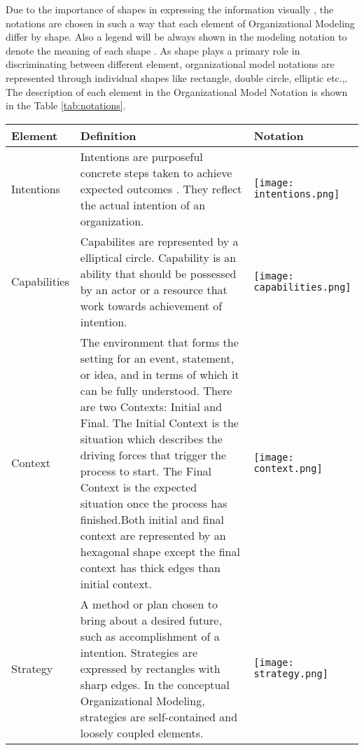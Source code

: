  Due to the importance of shapes in expressing the information visually , the notations are chosen in such a way that each element of Organizational Modeling  differ by shape. Also a legend will be always shown in the modeling notation to denote the meaning of each shape \cite{Moody2009}. As shape plays a primary role in discriminating between different element, organizational model notations are represented through individual shapes like rectangle, double circle, elliptic etc.,. The description of each element in the Organizational Model Notation is shown in the Table \ref{tab:notations}. 

\begin{center}
	\begin{longtable}{p{3cm}p{10cm}p{3cm}}
		\toprule 
		\textbf{Element} & \textbf{Definition} & \textbf{Notation} \\
		\midrule
		\endfirsthead
		Intentions 			& Intentions are purposeful concrete steps taken to achieve expected outcomes . They reflect the actual intention of an organization. & \begin{center} \texttt{[image: intentions.png]}  \end{center}  \\  
		
		Capabilities	&  Capabilites are represented by a elliptical circle. Capability is an ability that should be possessed by an actor or a resource that work towards achievement of intention.   & \begin{center} \texttt{[image: capabilities.png]} \end{center}   \\
		
		Context				& The environment that forms the setting for an event, statement, or idea, and in terms of which it can be fully understood. There are two Contexts: Initial and Final. The Initial Context is the situation which describes the driving forces that trigger the process to start. The Final Context is the expected situation once the process has finished.Both initial and final context are represented by an hexagonal shape except the final context has thick edges than initial context.  & \begin{center} \texttt{[image: context.png]} \end{center}  \\
		
		
		Strategy		&  A method or plan chosen to bring about a desired future, such as accomplishment of a intention. Strategies are expressed by rectangles with sharp edges. In the conceptual Organizational Modeling, strategies are self-contained and loosely coupled elements.   & \begin{center} \texttt{[image: strategy.png]} \end{center}   \\
		

\end{longtable}
\end{center}
